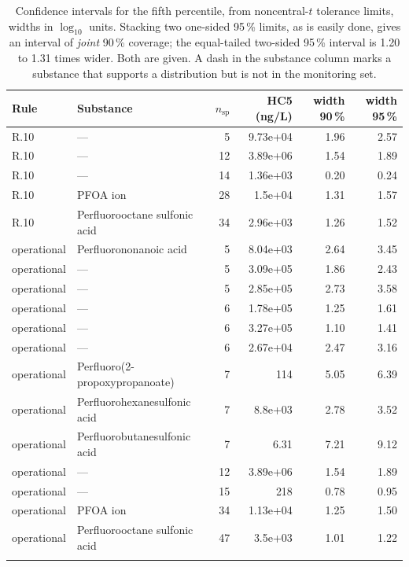 \begin{table}[htbp]\centering\scriptsize\setlength{\tabcolsep}{2.4pt}
\caption{Confidence intervals for the fifth percentile, from noncentral-$t$ tolerance limits, widths in $\log_{10}$ units. Stacking two one-sided 95\,\% limits, as is easily done, gives an interval of \emph{joint} 90\,\% coverage; the equal-tailed two-sided 95\,\% interval is 1.20 to 1.31 times wider. Both are given. A dash in the substance column marks a substance that supports a distribution but is not in the monitoring set.}
\label{tab:s2}
\begin{tabular}{@{}l >{\raggedright\arraybackslash}p{} rrrr@{}}\toprule
Rule & Substance & $n_\mathrm{sp}$ & HC5 (ng/L) & width 90\,\% & width 95\,\%\\\midrule
R.10 & --- & 5 & 9.73e+04 & 1.96 & 2.57\\
R.10 & --- & 12 & 3.89e+06 & 1.54 & 1.89\\
R.10 & --- & 14 & 1.36e+03 & 0.20 & 0.24\\
R.10 & PFOA ion & 28 & 1.5e+04 & 1.31 & 1.57\\
R.10 & Perfluorooctane sulfonic acid & 34 & 2.96e+03 & 1.26 & 1.52\\
\addlinespace
operational & Perfluorononanoic acid & 5 & 8.04e+03 & 2.64 & 3.45\\
operational & --- & 5 & 3.09e+05 & 1.86 & 2.43\\
operational & --- & 5 & 2.85e+05 & 2.73 & 3.58\\
operational & --- & 6 & 1.78e+05 & 1.25 & 1.61\\
operational & --- & 6 & 3.27e+05 & 1.10 & 1.41\\
operational & --- & 6 & 2.67e+04 & 2.47 & 3.16\\
operational & Perfluoro(2-propoxypropanoate) & 7 & 114 & 5.05 & 6.39\\
operational & Perfluorohexanesulfonic acid & 7 & 8.8e+03 & 2.78 & 3.52\\
operational & Perfluorobutanesulfonic acid & 7 & 6.31 & 7.21 & 9.12\\
operational & --- & 12 & 3.89e+06 & 1.54 & 1.89\\
operational & --- & 15 & 218 & 0.78 & 0.95\\
operational & PFOA ion & 34 & 1.13e+04 & 1.25 & 1.50\\
operational & Perfluorooctane sulfonic acid & 47 & 3.5e+03 & 1.01 & 1.22\\
\addlinespace
\bottomrule\end{tabular}\end{table}
